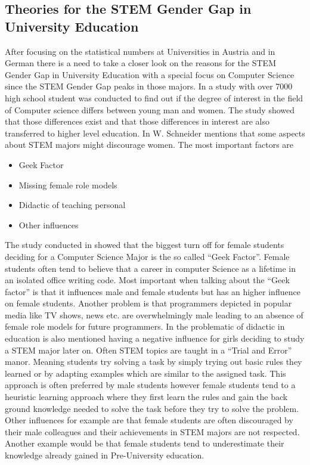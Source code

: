 \documentclass[12pt]{article}
\begin{document}
\subsection{Theories for the STEM Gender Gap in University Education}
\label{theories}
After focusing on the statistical numbers at Universities in Austria and in German there is a need to take a closer look on the reasons for the STEM Gender Gap in University Education with a special focus on Computer Science since the STEM Gender Gap peaks in those majors.
In \cite{chan} a study with over 7000 high school student was conducted to find out if the degree of interest in the field of Computer science differs between young man and women. The study showed that those differences exist and that those differences in interest are also transferred to higher level education. \newline
In \cite{schneider} W. Schneider mentions that some aspects about STEM majors might discourage women. The most important factors are
\begin{itemize}
	\item Geek Factor
	\item Missing female role models
	\item Didactic of teaching personal
	\item Other influences 
\end{itemize}
The study conducted in \cite{chan} showed that the biggest turn off for female students deciding for a Computer Science Major is the so called ``Geek Factor''. Female students often tend to believe that a career in computer Science as a lifetime in an isolated office writing code. Most important when talking about the ``Geek factor'' is that it influences male and female students but has an higher influence on female students. 
Another problem is that programmers depicted in popular media like TV shows, news etc. are overwhelmingly male leading to an absence of female role models for future programmers.
In \cite{diff} the problematic of didactic in education is also mentioned having a negative influence for girls deciding to study a STEM major later on. Often STEM topics are taught in a ``Trial and Error'' manor. Meaning students try solving a task by simply trying out basic rules they learned or by adapting examples which are similar to the assigned task. This approach is often preferred by male students however female students tend to a heuristic learning approach where they first learn the rules and gain the back ground knowledge needed to solve the task before they try to solve the problem. \newline  
Other influences for example are that female students are often discouraged by their male colleagues and their achievements in STEM majors are not respected. Another example would be that female students tend to underestimate their knowledge already gained in Pre-University education.


\newline


\newpage
\listoffigures
\listoftables
\end{document}
